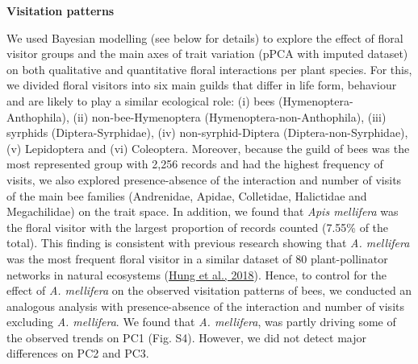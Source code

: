 \documentclass[
  12pt,
  a4paper,
]{article}
\begin{document}
\textbf{Visitation patterns}

We used Bayesian modelling (see below for details) to explore the effect of floral visitor groups and the main axes of trait variation (pPCA with imputed dataset) on both qualitative and quantitative floral interactions per plant species. For this, we divided floral visitors into six main guilds that differ in life form, behaviour and are likely to play a similar ecological role: (i) bees (Hymenoptera-Anthophila), (ii) non-bee-Hymenoptera (Hymenoptera-non-Anthophila), (iii) syrphids (Diptera-Syrphidae), (iv) non-syrphid-Diptera (Diptera-non-Syrphidae), (v) Lepidoptera and (vi) Coleoptera. Moreover, because the guild of bees was the most represented group with 2,256 records and had the highest frequency of visits, we also explored presence-absence of the interaction and number of visits of the main bee families (Andrenidae, Apidae, Colletidae, Halictidae and Megachilidae) on the trait space. In addition, we found that \emph{Apis mellifera} was the floral visitor with the largest proportion of records counted (7.55\% of the total). This finding is consistent with previous research showing that \emph{A. mellifera} was the most frequent floral visitor in a similar dataset of 80 plant-pollinator networks in natural ecosystems (\protect\hyperlink{ref-hung2018}{Hung et al., 2018}). Hence, to control for the effect of \emph{A. mellifera} on the observed visitation patterns of bees, we conducted an analogous analysis with presence-absence of the interaction and number of visits excluding \emph{A. mellifera}. We found that \emph{A. mellifera}, was partly driving some of the observed trends on PC1 (Fig. S4). However, we did not detect major differences on PC2 and PC3.
\end{document}
